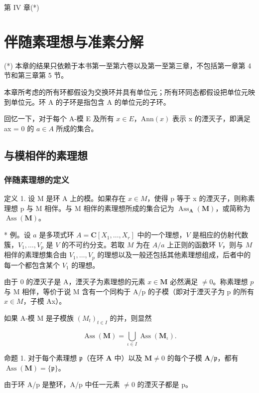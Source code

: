 第 IV 章(*)

\chapter{伴随素理想与准素分解}

(*) 本章的结果只依赖于本书第一至第六卷以及第一至第三章，不包括第一章第 4 节和第三章第 5 节。

本章所考虑的所有环都假设为交换环并具有单位元；所有环同态都假设把单位元映到单位元。环 A 的子环是指包含 A 的单位元的子环。

回忆一下，对于每个 A-模 E 及所有 \(x \in E\)，\(\text{Ann}(x)\) 表示 x 的湮灭子，即满足 ax = 0 的 \(a \in A\) 所成的集合。

\section{与模相伴的素理想}

\subsection{伴随素理想的定义}

定义 1. 设 M 是环 A 上的模。如果存在 \(x \in M\)，使得 p 等于 x 的湮灭子，则称素理想 p 与 M 相伴。与 M 相伴的素理想所成的集合记为 \(\operatorname{Ass}_{\mathbf{A}}(\mathbf{M})\)，或简称为 \(\operatorname{Ass}(\mathbf{M})\)。

* 例。设 \(a\) 是多项式环 \(A = \mathbf{C}[X_1, \ldots, X_r]\) 中的一个理想，\(V\) 是相应的仿射代数簇，\(V_1, \ldots, V_p\) 是 \(V\) 的不可约分支。若取 \(M\) 为在 \(A/a\) 上正则的函数环 \(V\)，则与 \(M\) 相伴的素理想集合由 \(V_1, \ldots, V_p\) 的理想以及一般还包括其他素理想组成，后者中的每一个都包含某个 \(V_1\) 的理想。

由于 0 的湮灭子是 A，湮灭子为素理想的元素 \(x \in \mathbf{M}\) 必然满足 \(\neq 0\)。称素理想 \(p\) 与 M 相伴，等价于说 M 含有一个同构于 A/p 的子模（即对于湮灭子为 p 的所有 \(x \in M\)，子模 Ax）。

如果 A-模 M 是子模族 \((M_{t})_{t\in I}\) 的并，则显然

\[
\operatorname{Ass} (\mathbf {M}) = \bigcup_ {\iota \in I} \operatorname{Ass} \left(\mathbf {M} _ {\iota}\right).\tag{1}
\]

命题 1. 对于每个素理想 \(\mathfrak{p}\)（在环 \(\mathbf{A}\) 中）以及 \(\mathbf{M} \neq 0\) 的每个子模 \(\mathbf{A} / \mathfrak{p}\)，都有 \(\operatorname{Ass}(\mathbf{M}) = \{\mathfrak{p}\}\)。

由于环 A/p 是整环，A/p 中任一元素 \(\neq0\) 的湮灭子都是 p。

